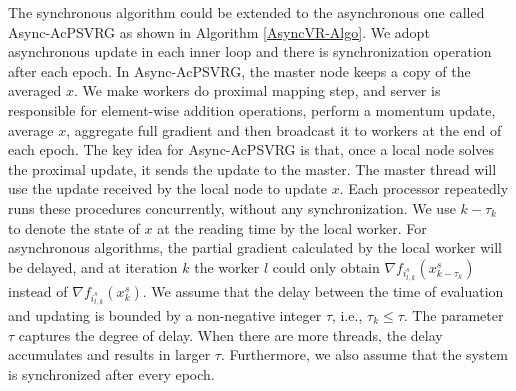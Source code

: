 \documentclass[letterpaper]{article} %
\begin{document}
The  synchronous algorithm could be extended to the asynchronous one called Async-AcPSVRG  as shown in Algorithm \ref{AsyncVR-Algo}. We adopt asynchronous update in each inner loop and there is synchronization operation after each epoch. In Async-AcPSVRG, the  master node keeps a copy of the averaged $x$. We make workers do proximal mapping step, and server is responsible for element-wise addition operations, perform a momentum update, average $x$, aggregate full gradient and then broadcast it to workers at the end of each epoch. 
The key idea for Async-AcPSVRG is that, once a local node solves the proximal update, it  sends  the update to the master. The master thread will use the update received by the local node to update $x$. Each processor repeatedly runs these procedures concurrently, without any synchronization. We use $k-\tau_k$ to denote the state of $x$ at the reading time by the local worker. For asynchronous algorithms, the partial gradient calculated by the local worker will be delayed, and at iteration $k$ the worker $l$ could only obtain $\nabla f_{i_{l,k}^s}(x_{k-\tau_k}^s)$ instead of $\nabla f_{i_{l,k}^s}(x_{k}^s)$. We assume that the delay between the time of evaluation and updating is bounded by a non-negative integer $\tau$, i.e., $\tau_k\leq \tau$. The parameter $\tau$ captures the degree of delay. When there are more threads, the delay accumulates and results in larger $\tau$. Furthermore, we also assume that the system is synchronized after every epoch.
\end{document}
